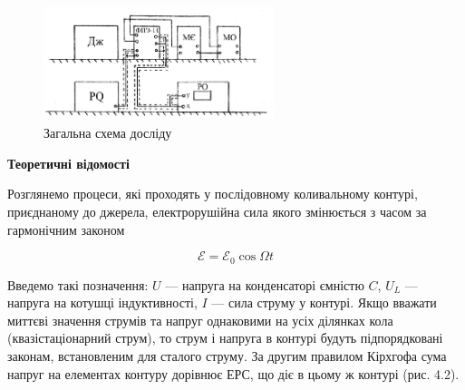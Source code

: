 \documentclass[12pt,a4paper]{article}
\begin{document}
    \begin{figure}[h!]

        \renewcommand{\thefigure}{4.\arabic{figure}} %

        \centering
        \includegraphics[width=0.6\textwidth]{main_schemma.png}
        \caption{Загальна схема досліду}
        \label{fig1:schema}

    \end{figure}


    \begin{center}
        \textbf{\Large Теоретичні відомості}
    \end{center}

    \setlength{\parindent}{1.5em}

    Розглянемо процеси, які проходять у послідовному коливальному контурі, приєднаному до джерела, електрорушійна сила якого змінюється з часом за гармонічним законом

    \begin{equation}
        \mathcal{E} = \mathcal{E}_0 \cos \Omega t
        \tag{4.1}
    \end{equation}

    Введемо такі позначення:
    $U$ --- напруга на конденсаторі ємністю $C$,
    $U_L$ --- напруга на котушці індуктивності, $I$ --- сила струму у контурі.
    Якщо вважати миттєві значення струмів та напруг однаковими на усіх ділянках кола
    (квазістаціонарний струм), то струм і напруга в контурі будуть підпорядковані законам,
    встановленим для сталого струму. За другим правилом Кірхгофа сума напруг на елементах контуру дорівнює ЕРС, що діє в цьому ж контурі (рис. 4.2).
    
\end{document}
